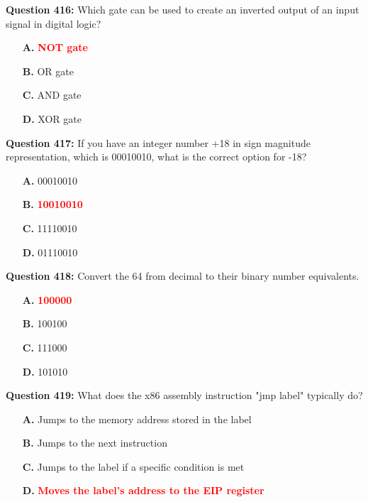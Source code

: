 \documentclass[12pt,a4paper]{article}
\begin{document}
\vspace{0.5cm}

\textbf{Question 416:} Which gate can be used to create an inverted output of an input signal in digital logic?

\begin{itemize}
    \item[\textbf{A.}] \textcolor{red}{\textbf{NOT gate}}
    \item[\textbf{B.}] OR gate
    \item[\textbf{C.}] AND gate
    \item[\textbf{D.}] XOR gate
\end{itemize}

\vspace{0.5cm}

\textbf{Question 417:} If you have an integer number +18 in sign magnitude representation, which is 00010010, what is the correct option for -18?

\begin{itemize}
    \item[\textbf{A.}] 00010010
    \item[\textbf{B.}] \textcolor{red}{\textbf{10010010}}
    \item[\textbf{C.}] 11110010
    \item[\textbf{D.}] 01110010
\end{itemize}

\vspace{0.5cm}

\textbf{Question 418:} Convert the 64 from decimal to their binary number equivalents.

\begin{itemize}
    \item[\textbf{A.}] \textcolor{red}{\textbf{100000}}
    \item[\textbf{B.}] 100100
    \item[\textbf{C.}] 111000
    \item[\textbf{D.}] 101010
\end{itemize}

\vspace{0.5cm}

\textbf{Question 419:} What does the x86 assembly instruction "jmp label" typically do?

\begin{itemize}
    \item[\textbf{A.}] Jumps to the memory address stored in the label
    \item[\textbf{B.}] Jumps to the next instruction
    \item[\textbf{C.}] Jumps to the label if a specific condition is met
    \item[\textbf{D.}] \textcolor{red}{\textbf{Moves the label's address to the EIP register}}
\end{itemize}
\end{document}
